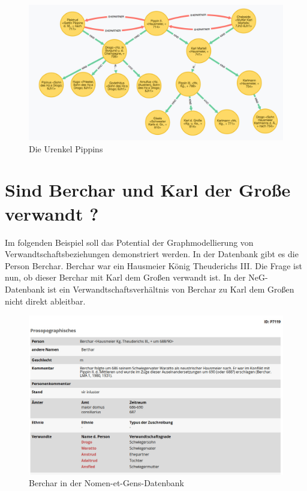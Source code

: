\documentclass[ngerman,]{scrreprt}
\begin{document}
\begin{figure}
\centering
\includegraphics{Bilder/NeG/030-Urenkel-Pippins.jpg}
\caption{Die Urenkel Pippins}
\end{figure}

\hypertarget{sind-berchar-und-karl-der-grouxdfe-verwandt}{%
\section{Sind Berchar und Karl der Große verwandt ?}\label{sind-berchar-und-karl-der-grouxdfe-verwandt}}

Im folgenden Beispiel soll das Potential der Graphmodellierung von Verwandtschaftsbeziehungen demonstriert werden. In der Datenbank gibt es die Person Berchar. Berchar war ein Hausmeier König Theuderichs III. Die Frage ist nun, ob dieser Berchar mit Karl dem Großen verwandt ist. In der NeG-Datenbank ist ein Verwandtschaftsverhältnis von Berchar zu Karl dem Großen nicht direkt ableitbar.

\begin{figure}
\centering
\includegraphics{Bilder/NeG/040-Berchar-DB-Eintrag.jpg}
\caption{Berchar in der Nomen-et-Gens-Datenbank}
\end{figure}
\end{document}
